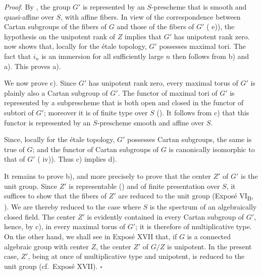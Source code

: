 \medskip
\noindent\textit{Proof.}
By , the group \(G'\) is represented by an \(S\)-prescheme that
is smooth and quasi-affine over \(S\), with affine fibers. In view
of the correspondence between Cartan subgroups of the fibers of
\(G\) and those of the fibers of \(G'\) ( e)), the
hypothesis on the unipotent rank of \(Z\) implies that \(G'\) has
unipotent rank zero.  now shows that, locally for the
étale topology, \(G'\) possesses maximal tori. The fact that \(i_n\)
is an immersion for all sufficiently large \(n\) then follows from
 b) and  a). This proves a).

We now prove c). Since \(G'\) has unipotent rank zero, every maximal
torus of \(G'\) is plainly also a Cartan subgroup of \(G'\). The
functor of maximal tori of \(G'\) is represented by a subprescheme
that is both open and closed in the functor of subtori of \(G'\);
moreover it is of finite type over \(S\) ().
It follows from  c) that this functor is represented by an
\(S\)-prescheme smooth and affine over \(S\).

Since, locally for the étale topology, \(G'\) possesses Cartan
subgroups, the same is true of \(G\); and the functor of Cartan
subgroups of \(G\) is canonically isomorphic to that of \(G'\)
( iv)). Thus c) implies d).

It remains to prove b), and more precisely to prove that the center
\(Z'\) of \(G'\) is the unit group. Since \(Z'\) is representable
() and of finite presentation over \(S\), it suffices
to show that the fibers of \(Z'\) are reduced to the unit group
(Exposé VI\textsubscript{B}, ). We are thereby reduced to the
case where \(S\) is the spectrum of an algebraically closed field.
The center \(Z'\) is evidently contained in every Cartan subgroup
of \(G'\), hence, by c), in every maximal torus of \(G'\); it is
therefore of multiplicative type. On the other hand, we shall see
in Exposé XVII that, if \(G\) is a connected algebraic group with
center \(Z\), the center \(Z'\) of \(G/Z\) is unipotent. In the
present case, \(Z'\), being at once of multiplicative type and
unipotent, is reduced to the unit group (cf.\ Exposé XVII).
\hfill\(\square\)

